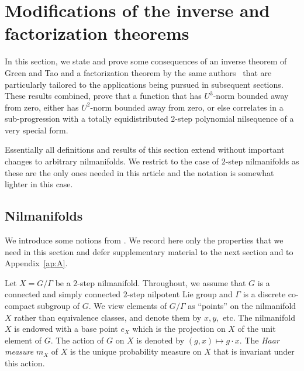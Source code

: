 \documentclass[11pt]{amsart}
\theoremstyle{definition}
\begin{document}
\section{Modifications of the inverse and factorization theorems}
\label{S:InverseFactorization} In this section, we state and prove
some consequences of an inverse theorem  of Green and Tao
\cite{GT08}
 and a
factorization theorem by the same authors~\cite{GT12a} that  are
particularly tailored to the applications being pursued   in
subsequent sections. These results combined, prove that a function
that has
 $U^3$-norm bounded away from zero, either has  $U^2$-norm bounded away from zero, or else
 correlates in a sub-progression with a totally equidistributed $2$-step polynomial nilsequence
 of a very special form.

Essentially all  definitions and results of this section extend without important changes to
 arbitrary nilmanifolds. We restrict to the case  of $2$-step nilmanifolds
 as these are the only ones needed in this article and  the notation is somewhat lighter in this case.

\subsection{Nilmanifolds}
\label{subsec:nilmanifolds}
We introduce some notions from \cite{GT12a}. We record here only the properties that
 we  need in this section and defer supplementary material to the next section and to Appendix~\ref{ap:A}.

Let $X=G/\Gamma$ be a
$2$-step nilmanifold.  Throughout, we assume  that $G$ is a connected and simply
 connected $2$-step nilpotent Lie group and $\Gamma$ is a discrete co-compact subgroup
of $G$. We view elements of $G/\Gamma$ as ``points'' on the
nilmanifold $X$ rather than equivalence classes, and denote  them by
$x,y,$ etc. The nilmanifold $X$ is endowed with a base point $e_X$
which is the projection on $X$ of the unit element of $G$.
 The action of $G$ on $X$ is denoted by
$(g,x)\mapsto g\cdot x$. The \emph{Haar measure} $m_X$ of $X$ is the unique probability measure on $X$ that is invariant under this action.
\end{document}
